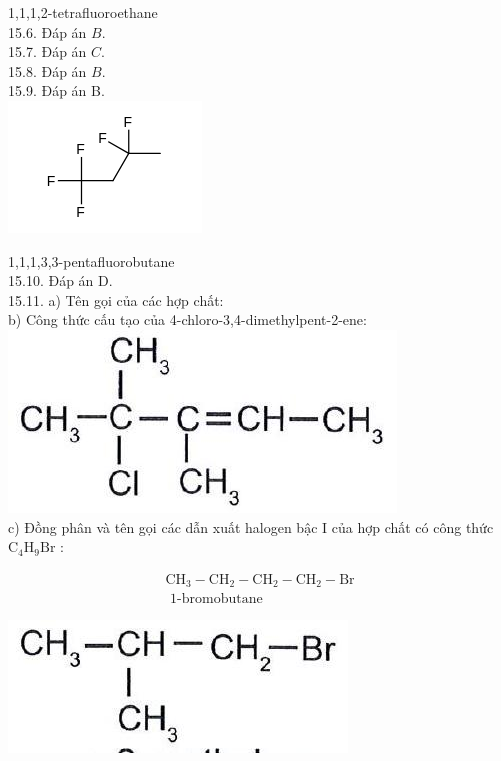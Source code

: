\documentclass[10pt]{article}
\begin{document}
1,1,1,2-tetrafluoroethane\\
15.6. Đáp án $B$.\\
15.7. Đáp án $C$.\\
15.8. Đáp án $B$.\\
15.9. Đáp án B.\\
\includegraphics{smile-f87707cdd5c233c19d8d82b02c096ebe178e9822}

1,1,1,3,3-pentafluorobutane\\
15.10. Đáp án D.\\
15.11. a) Tên gọi của các hợp chất:\\
b) Công thức cấu tạo của 4-chloro-3,4-dimethylpent-2-ene:\\
\includegraphics[max width=\textwidth, center]{2025_10_23_adad5b98d65ac6665838g-31(1)}\\
c) Đồng phân và tên gọi các dẫn xuất halogen bậc I của hợp chất có công thức $\mathrm{C}_{4} \mathrm{H}_{9} \mathrm{Br}$ :

$$
\begin{gathered}
\mathrm{CH}_{3}-\mathrm{CH}_{2}-\mathrm{CH}_{2}-\mathrm{CH}_{2}-\mathrm{Br} \\
\text { 1-bromobutane }
\end{gathered}
$$

\begin{center}
\includegraphics[max width=\textwidth]{2025_10_23_adad5b98d65ac6665838g-31}
\end{center}
\end{document}
